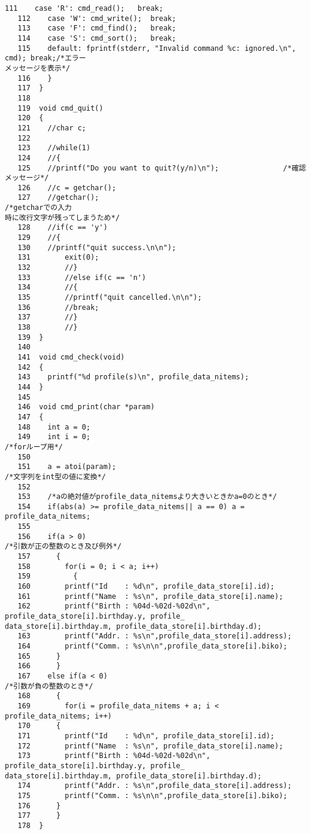 \begin{Verbatim}[fontsize=\small, baselinestretch=0.8]
   111	  case 'R': cmd_read();   break;
   112	  case 'W': cmd_write();  break;
   113	  case 'F': cmd_find();   break;
   114	  case 'S': cmd_sort();   break;
   115	  default: fprintf(stderr, "Invalid command %c: ignored.\n", cmd); break;/*エラー
メッセージを表示*/
   116	  }
   117	}
   118	
   119	void cmd_quit()
   120	{
   121	  //char c;
   122	
   123	  //while(1)
   124	  //{
   125	  //printf("Do you want to quit?(y/n)\n");               /*確認メッセージ*/
   126	  //c = getchar();
   127	  //getchar();                                           /*getcharでの入力
時に改行文字が残ってしまうため*/
   128	  //if(c == 'y')
   129	  //{
   130	  //printf("quit success.\n\n");
   131		  exit(0);
   132		  //}
   133		  //else if(c == 'n')
   134		  //{
   135		  //printf("quit cancelled.\n\n");
   136		  //break;
   137		  //}
   138		  //}
   139	}
   140	
   141	void cmd_check(void)
   142	{
   143	  printf("%d profile(s)\n", profile_data_nitems);
   144	}
   145	
   146	void cmd_print(char *param)
   147	{
   148	  int a = 0;
   149	  int i = 0;                                                 /*forループ用*/
   150	
   151	  a = atoi(param);                                           /*文字列をint型の値に変換*/
   152	
   153	  /*aの絶対値がprofile_data_nitemsより大きいときかa=0のとき*/
   154	  if(abs(a) >= profile_data_nitems|| a == 0) a = profile_data_nitems;
   155	
   156	  if(a > 0)                                                  /*引数が正の整数のとき及び例外*/
   157	    {
   158	      for(i = 0; i < a; i++)
   159	        {
   160		  printf("Id    : %d\n", profile_data_store[i].id);
   161		  printf("Name  : %s\n", profile_data_store[i].name);
   162		  printf("Birth : %04d-%02d-%02d\n", profile_data_store[i].birthday.y, profile_
data_store[i].birthday.m, profile_data_store[i].birthday.d);
   163		  printf("Addr. : %s\n",profile_data_store[i].address);
   164		  printf("Comm. : %s\n\n",profile_data_store[i].biko);
   165		}
   166	    }
   167	  else if(a < 0)                                             /*引数が負の整数のとき*/
   168	    {
   169	      for(i = profile_data_nitems + a; i < profile_data_nitems; i++)
   170		{
   171		  printf("Id    : %d\n", profile_data_store[i].id);
   172		  printf("Name  : %s\n", profile_data_store[i].name);
   173		  printf("Birth : %04d-%02d-%02d\n", profile_data_store[i].birthday.y, profile_
data_store[i].birthday.m, profile_data_store[i].birthday.d);
   174		  printf("Addr. : %s\n",profile_data_store[i].address);
   175		  printf("Comm. : %s\n\n",profile_data_store[i].biko);
   176		}
   177	    }
   178	}

\end{Verbatim}

